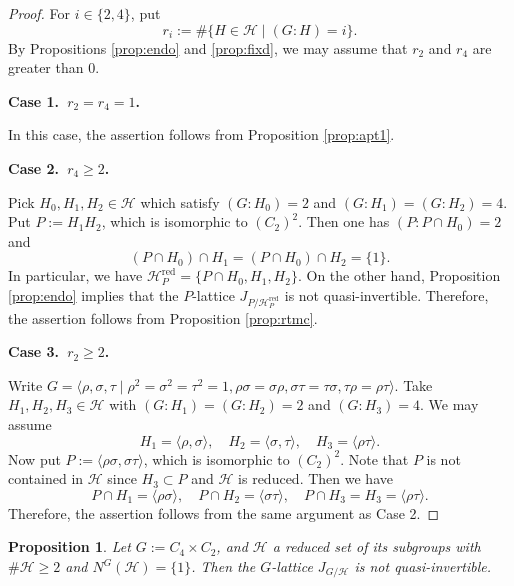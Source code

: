 \documentclass[12pt]{amsart}
\theoremstyle{plain}
\newtheorem{prop}[thm]{Proposition}
\theoremstyle{definition}
\numberwithin{thm}{section}
\numberwithin{equation}{section}
\newcommand{\cH}{\mathcal{H}}
\DeclareMathOperator{\red}{red}
\begin{document}
\begin{proof}
For $i\in \{2,4\}$, put
\begin{equation*}
r_{i}:=\#\{H\in \cH \mid (G:H)=i\}. 
\end{equation*}
By Propositions \ref{prop:endo} and \ref{prop:fixd}, we may assume that $r_{2}$ and $r_{4}$ are greater than $0$. 

\textbf{Case 1.~$r_{2}=r_{4}=1$. }

In this case, the assertion follows from Proposition \ref{prop:apt1}. 

\textbf{Case 2.~$r_{4}\geq 2$. }

Pick $H_{0},H_{1},H_{2}\in \cH$ which satisfy $(G:H_{0})=2$ and $(G:H_{1})=(G:H_{2})=4$. Put $P:=H_{1}H_{2}$, which is isomorphic to $(C_{2})^{2}$. Then one has $(P:P\cap H_{0})=2$ and 
\begin{equation*}
(P\cap H_{0})\cap H_{1}=(P\cap H_{0})\cap H_{2}=\{1\}. 
\end{equation*}
In particular, we have $\cH_{P}^{\red}=\{P\cap H_{0},H_{1},H_{2}\}$. On the other hand, Proposition \ref{prop:endo} implies that the $P$-lattice $J_{P/\cH_{P}^{\red}}$ is not quasi-invertible. Therefore, the assertion follows from Proposition \ref{prop:rtmc}. 

\textbf{Case 3.~$r_{2}\geq 2$. }

Write $G=\langle \rho,\sigma,\tau \mid \rho^{2}=\sigma^{2}=\tau^{2}=1,\rho\sigma=\sigma\rho,\sigma\tau=\tau\sigma,\tau\rho=\rho\tau\rangle$. Take $H_{1},H_{2},H_{3}\in \cH$ with $(G:H_{1})=(G:H_{2})=2$ and $(G:H_{3})=4$. We may assume
\begin{equation*}
H_{1}=\langle \rho,\sigma \rangle,\quad H_{2}=\langle \sigma,\tau \rangle,\quad H_{3}=\langle \rho\tau\rangle. 
\end{equation*}
Now put $P:=\langle \rho\sigma,\sigma\tau \rangle$, which is isomorphic to $(C_{2})^{2}$. Note that $P$ is not contained in $\cH$ since $H_{3}\subset P$ and $\cH$ is reduced. Then we have
\begin{equation*}
P\cap H_{1}=\langle \rho\sigma \rangle,\quad P\cap H_{2}=\langle \sigma\tau \rangle,\quad P\cap H_{3}=H_{3}=\langle \rho\tau \rangle. 
\end{equation*}
Therefore, the assertion follows from the same argument as Case 2. 
\end{proof}

\begin{prop}\label{prop:c4nr}
Let $G:=C_{4}\times C_{2}$, and $\cH$ a reduced set of its subgroups with $\#\cH \geq 2$ and $N^{G}(\cH)=\{1\}$. Then the $G$-lattice $J_{G/\cH}$ is not quasi-invertible. 
\end{prop}
\end{document}
